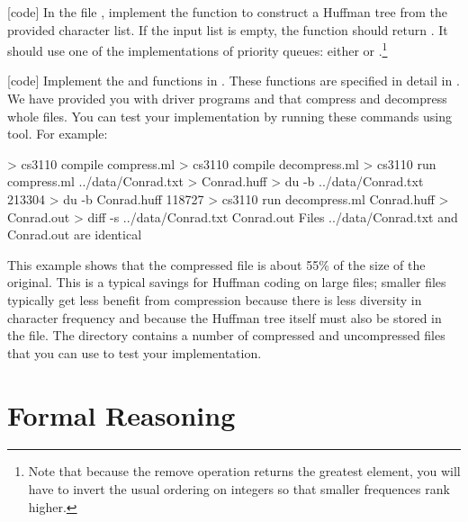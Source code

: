 \documentclass{pset}
\begin{document}
% 
% 
% 

\newpage{}

\exercise{} 

[code] In the file , implement the
 function to construct a Huffman tree from the
provided character list.  If the input list is empty, the
 function should return . It should use
one of the implementations of priority queues: either
 or .\footnote{Note that
  because the remove operation returns the greatest element, you will
  have to invert the usual ordering on integers so that smaller
  frequences rank higher.}

%
\exercise{} 

[code] Implement the  and  functions in
.  These functions are specified in detail in
. We have provided you with driver programs
 and  that compress and
decompress whole files. You can test your implementation by running
these commands using  tool. For example:
\begin{ocaml}
> cs3110 compile compress.ml
> cs3110 compile decompress.ml
> cs3110 run compress.ml ../data/Conrad.txt > Conrad.huff
> du -b ../data/Conrad.txt
213304	
> du -b Conrad.huff
118727
> cs3110 run decompress.ml Conrad.huff > Conrad.out
> diff -s ../data/Conrad.txt Conrad.out
Files ../data/Conrad.txt and Conrad.out are identical
\end{ocaml}

This example shows that the compressed file is about 55\% of the size of
the original.  This is a typical savings for Huffman coding on large files;
smaller files typically get less benefit from compression because there is less
diversity in character frequency and because the Huffman tree itself must also
be stored in the file.  The  directory contains a number of
compressed and uncompressed files that you can use to test your implementation.

\newpage{}

\part{Formal Reasoning}
\end{document}
